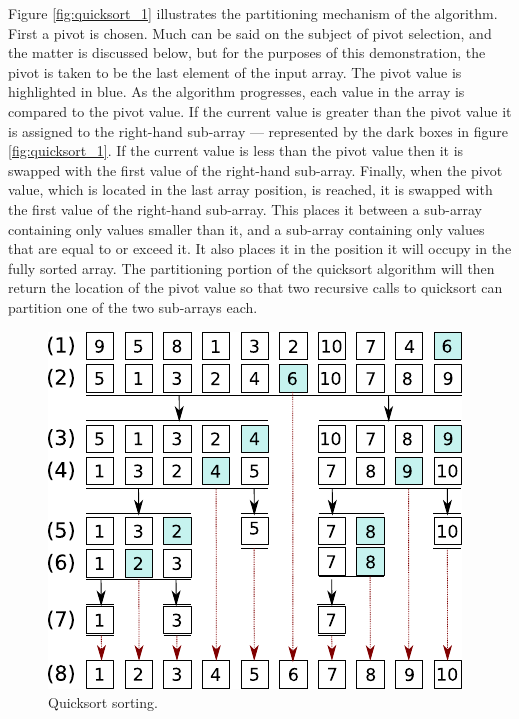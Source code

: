 \documentclass[12pt, a4paper]{article}
\begin{document}
Figure \ref{fig:quicksort_1} illustrates the partitioning mechanism of the algorithm. First a pivot is chosen. Much can be said on the subject of pivot selection, and the matter is discussed below, but for the purposes of this demonstration, the pivot is taken to be the last element of the input array. The pivot value is highlighted in blue. As the algorithm progresses, each value in the array is compared to the pivot value. If the current value is greater than the pivot value it is assigned to the right-hand sub-array — represented by the dark boxes in figure \ref{fig:quicksort_1}. If the current value is less than the pivot value then it is swapped with the first value of the right-hand sub-array. Finally, when the pivot value, which is located in the last array position, is reached, it is swapped with the first value of the right-hand sub-array. This places it between a sub-array containing only values smaller than it, and a sub-array containing only values that are equal to or exceed it. It also places it in the position it will occupy in the fully sorted array. The partitioning portion of the quicksort algorithm will then return the location of the pivot value so that two recursive calls to quicksort can partition one of the two sub-arrays each.

\begin{figure}
    \centering
    \includegraphics{quicksort_2.pdf}
    \caption{\label{fig:quicksort_2}Quicksort sorting.}
\end{figure}
\end{document}
